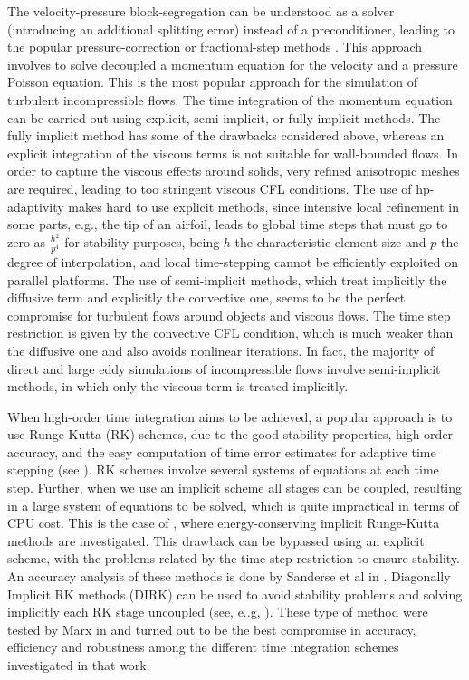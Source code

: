 The velocity-pressure block-segregation can be understood as a solver (introducing an additional splitting error) instead of a preconditioner, leading to the popular pressure-correction or fractional-step methods \cite{kim_application_1985,le_improvement_1991,codina_pressure_2006,badia_algebraic_2008}. This approach involves to solve decoupled a momentum equation for the velocity and a pressure Poisson equation. This is the most popular approach for the simulation of turbulent incompressible flows. The time integration of the momentum equation can be carried out using explicit, semi-implicit, or fully implicit methods. The fully implicit method has some of the drawbacks considered above, whereas an explicit integration of the viscous terms is not suitable for wall-bounded flows. In order to capture the viscous effects around solids, very refined anisotropic meshes are required, leading to too stringent viscous CFL conditions. The use of hp-adaptivity makes hard to use explicit methods, since intensive local refinement in some parts, e.g., the tip of an airfoil, leads to global time steps that must go to zero as $\frac{h^2 }{p^4}$ for stability purposes, being $h$ the characteristic element size and $p$ the degree of interpolation, and local time-stepping cannot be efficiently exploited on parallel platforms. The use of semi-implicit methods, which treat implicitly the diffusive term and explicitly the convective one, seems to be the perfect compromise for turbulent flows around objects and viscous flows. The time step restriction is given by the convective {CFL} condition, which is much weaker than the diffusive one and also avoids nonlinear iterations. In fact, the majority of direct and large eddy simulations of incompressible flows involve semi-implicit methods, in which only the viscous term is treated implicitly. 

When high-order time integration aims to be achieved, a popular approach is to use Runge-Kutta (RK) schemes, due to the good stability properties, high-order accuracy, and the easy computation of time error estimates for adaptive time stepping (see \cite{hairer_numerical_1989,de_swart_construction_1997}). RK schemes involve several systems of equations at each time step. Further, when we use an implicit scheme all stages can be coupled, resulting in a large system of equations to be solved, which is quite impractical in terms of CPU cost. This is the case of \cite{sanderse_energy-conserving_2013}, where energy-conserving implicit Runge-Kutta methods are investigated. 
This drawback can be bypassed using an explicit scheme, with the problems related by the time step restriction to ensure stability. An accuracy analysis of these methods is done by Sanderse et al in \cite{sanderse_accuracy_2012}. 
Diagonally Implicit RK methods (DIRK) can be used to avoid stability problems and solving implicitly each RK stage uncoupled (see, e..g, \cite{marx_time_1994}). These type of method were tested by Marx in \cite{marx_time_1994} and turned out to be the best compromise in accuracy, efficiency and robustness among the different time integration schemes investigated in that work.

